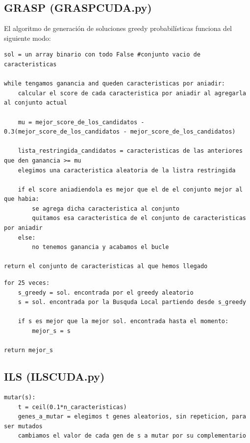 \documentclass[10pt,a4paper]{article}
\begin{document}
\newpage

\subsection{\color[rgb]{0.0,0.0,0.51}GRASP (GRASPCUDA.py)}

El algoritmo de generación de soluciones greedy probabilísticas funciona del siguiente modo:\\
\begin{lstlisting}
sol = un array binario con todo False #conjunto vacio de caracteristicas

while tengamos ganancia and queden caracteristicas por aniadir:
	calcular el score de cada caracteristica por aniadir al agregarla al conjunto actual
	
	mu = mejor_score_de_los_candidatos - 0.3(mejor_score_de_los_candidatos - mejor_score_de_los_candidatos)
	
	lista_restringida_candidatos = caracteristicas de las anteriores que den ganancia >= mu
	elegimos una caracteristica aleatoria de la listra restringida
	
	if el score aniadiendola es mejor que el de el conjunto mejor al que habia:
		se agrega dicha caracteristica al conjunto
		quitamos esa caracteristica de el conjunto de caracteristicas por aniadir
	else:
		no tenemos ganancia y acabamos el bucle
		
return el conjunto de caracteristicas al que hemos llegado
\end{lstlisting}

\begin{lstlisting}
for 25 veces:
	s_greedy = sol. encontrada por el greedy aleatorio
	s = sol. encontrada por la Busquda Local partiendo desde s_greedy
	
	if s es mejor que la mejor sol. encontrada hasta el momento:
		mejor_s = s
		
return mejor_s	
\end{lstlisting}

\newpage
\subsection{\color[rgb]{0.0,0.0,0.51} ILS (ILSCUDA.py)}
\begin{lstlisting}
mutar(s):
	t = ceil(0.1*n_caracteristicas)
	genes_a_mutar = elegimos t genes aleatorios, sin repeticion, para ser mutados
	cambiamos el valor de cada gen de s a mutar por su complementario
	
\end{lstlisting}
\end{document}
